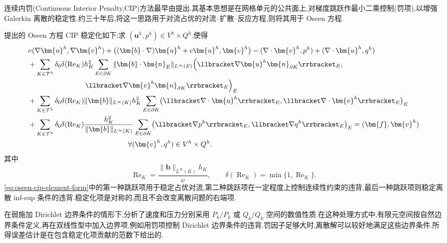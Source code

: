 \begin{note}\label{note:oseen-cip-method}
连续内罚(Continuous Interior Penalty,CIP)方法最早由\textcite{DouglasDupont1976}提出.其基本思想是在网格单元的公共面上,对梯度跳跃作最小二乘控制(罚项),以增强 Galerkin 离散的稳定性.约三十年后,\textcite{BurmanHansbo2004}将这一思路用于对流占优的对流--扩散--反应方程,\textcite{BurmanFernandezHansbo2006}则将其用于 Oseen 方程.

\textcite{BurmanFernandezHansbo2006}提出的 Oseen 方程 CIP 稳定化如下:求 $(\bm{u}^h,p^h)\in V^h\times Q^h$,使得
\begin{equation}\label{eq:oseen-cip-element-form}
\begin{aligned}
 &\nu(\nabla\bm{u}^h,\nabla\bm{v}^h)
   +\bigl((\bm{b}\cdot\nabla)\bm{u}^h+c\bm{u}^h,
          \bm{v}^h\bigr)
   -(\nabla\cdot\bm{v}^h,p^h)
   +(\nabla\cdot\bm{u}^h,q^h)\\
 &+\sum_{K\in\mathcal{T}^h}
      \delta_0\delta(\operatorname{Re}_K)h_K^2
      \sum_{E\in\partial K}\|\bm{b}\cdot\bm{n}_E\|_{L^\infty(E)}
      \Bigl(\llbracket\nabla\bm{u}^h\bm{n}_{\partial K}\rrbracket_E,\\
 &\hspace{8em}
       \llbracket\nabla\bm{v}^h\bm{n}_{\partial K}\rrbracket_E\Bigr)_E\\
 &+\sum_{K\in\mathcal{T}^h}
      \delta_0\delta(\operatorname{Re}_K)
      \|\bm{b}\|_{L^\infty(K)}h_K^2
      \sum_{E\in\partial K}
      \bigl(\llbracket\nabla\cdot\bm{u}^h\rrbracket_E,
            \llbracket\nabla\cdot\bm{v}^h\rrbracket_E\bigr)_E\\
 &+\sum_{K\in\mathcal{T}^h}
      \delta_0\delta(\operatorname{Re}_K)
      \frac{h_K^2}{\|\bm{b}\|_{L^\infty(K)}}
      \sum_{E\in\partial K}
      \bigl(\llbracket\nabla p^h\rrbracket_E,
            \llbracket\nabla q^h\rrbracket_E\bigr)_E
   =(\bm{f},\bm{v}^h)\\
 &\hspace{14em}\forall(\bm{v}^h,q^h)\in V^h\times Q^h.
\end{aligned}
\end{equation}
其中
\[
  \operatorname{Re}_K=
    \frac{\|\bm{b}\|_{L^\infty(K)}h_K}{\nu},
  \qquad
  \delta(\operatorname{Re}_K)=\min\{1,\operatorname{Re}_K\}.
\]
\cref{eq:oseen-cip-element-form}中的第一种跳跃项用于稳定占优对流,第二种跳跃项在一定程度上控制连续性约束的违背,最后一种跳跃项则稳定离散 inf-sup 条件的违背.稳定化项是对称的,而且不会改变离散问题的右端项.

\textcite{BurmanFernandezHansbo2006}在弱施加 Dirichlet 边界条件的情形下,分析了速度和压力分别采用 $P_k/P_k$ 或 $Q_k/Q_k$ 空间的数值性质.在这种处理方式中,有限元空间按自然边界条件定义,再在双线性型中加入边界项,例如用罚项控制 Dirichlet 边界条件的违背.罚因子足够大时,离散解可以较好地满足这些边界条件.所得误差估计是在包含稳定化项贡献的范数下给出的.


\end{note}
